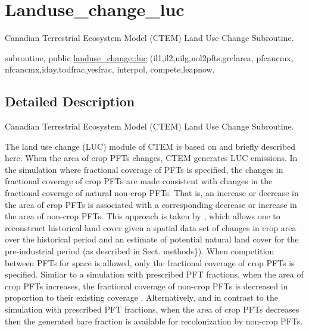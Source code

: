 \hypertarget{group__landuse__change__luc}{}\section{Landuse\+\_\+change\+\_\+luc}
\label{group__landuse__change__luc}


Canadian Terrestrial Ecosystem Model (C\+T\+E\+M) Land Use Change Subroutine.  


\begin{DoxyCompactItemize}
\item 
subroutine, public \hyperlink{group__landuse__change__luc_gaca416d24f2714c7a7de32fb9fb1033db}{landuse\+\_\+change\+::luc} (il1,il2,nilg,nol2pfts,grclarea, pfcancmx, nfcancmx,iday,todfrac,yesfrac, interpol, compete,leapnow,
\end{DoxyCompactItemize}


\subsection{Detailed Description}
Canadian Terrestrial Ecosystem Model (C\+T\+E\+M) Land Use Change Subroutine. 

The land use change (L\+U\+C) module of C\+T\+E\+M is based on \cite{Arora2010-416} and briefly described here. When the area of crop P\+F\+Ts changes, C\+T\+E\+M generates L\+U\+C emissions. In the simulation where fractional coverage of P\+F\+Ts is specified, the changes in fractional coverage of crop P\+F\+Ts are made consistent with changes in the fractional coverage of natural non-\/crop P\+F\+Ts. That is, an increase or decrease in the area of crop P\+F\+Ts is associated with a corresponding decrease or increase in the area of non-\/crop P\+F\+Ts. This approach is taken by \cite{Wang2006-he}, which allows one to reconstruct historical land cover given a spatial data set of changes in crop area over the historical period and an estimate of potential natural land cover for the pre-\/industrial period (as described in Sect. methods\}). When competition between P\+F\+Ts for space is allowed, only the fractional coverage of crop P\+F\+Ts is specified. Similar to a simulation with prescribed P\+F\+T fractions, when the area of crop P\+F\+Ts increases, the fractional coverage of non-\/crop P\+F\+Ts is decreased in proportion to their existing coverage \cite{Wang2006-he}. Alternatively, and in contrast to the simulation with prescribed P\+F\+T fractions, when the area of crop P\+F\+Ts decreases then the generated bare fraction is available for recolonization by non-\/crop P\+F\+Ts.

